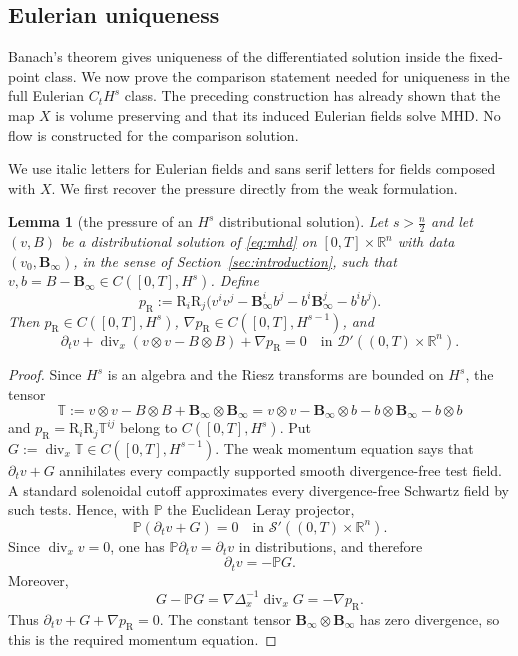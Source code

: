 \documentclass[11pt,reqno]{amsart}
\theoremstyle{plain}
\newtheorem{lemma}[theorem]{Lemma}
\theoremstyle{definition}
\theoremstyle{remark}
\numberwithin{equation}{section}
\DeclareMathOperator{\Div}{div}
\newcommand{\Binf}{\mathbf B_\infty}
\newcommand{\Real}{\mathbb R}
\newcommand{\Rn}{\Real^n}
\newcommand{\Riesz}{\mathrm R}
\begin{document}
\subsection{Eulerian uniqueness}
\label{ssec:unconditional-uniqueness}

Banach's theorem gives uniqueness of the differentiated solution inside the
fixed-point class. We now prove the comparison statement needed for uniqueness
in the full Eulerian $C_tH^s$ class. The preceding construction has already
shown that the map $X$ is volume preserving and that its induced Eulerian
fields solve MHD. No flow is constructed for the comparison solution.

We use italic letters for Eulerian fields and sans serif letters for fields
composed with $X$. We first recover the pressure directly from the weak
formulation.

\begin{lemma}[the pressure of an $H^s$ distributional solution]
\label{lem:pressure-recovery}
Let $s>\frac n2$ and let $(v,B)$ be a distributional solution of
\eqref{eq:mhd} on $[0,T]\times\Rn$ with data $(v_0,\Binf)$, in the sense of
Section~\ref{sec:introduction}, such that
$v,b=B-\Binf\in C([0,T],H^s)$. Define
\[
 p_{\mathrm R}:=\Riesz_i\Riesz_j
 \big(v^iv^j-\Binf^ib^j-b^i\Binf^j-b^ib^j\big).
\]
Then $p_{\mathrm R}\in C([0,T],H^s)$,
$\nabla p_{\mathrm R}\in C([0,T],H^{s-1})$, and
\[
 \partial_tv+\Div_x(v\otimes v-B\otimes B)+\nabla p_{\mathrm R}=0
 \quad\text{in }\mathcal D'((0,T)\times\Rn).
\]
\end{lemma}

\begin{proof}
Since $H^s$ is an algebra and the Riesz transforms are bounded on $H^s$, the
tensor
\[
 \mathbb T:=v\otimes v-B\otimes B+\Binf\otimes\Binf
 =v\otimes v-\Binf\otimes b-b\otimes\Binf-b\otimes b
\]
and $p_{\mathrm R}=\Riesz_i\Riesz_j\mathbb T^{ij}$ belong to
$C([0,T],H^s)$. Put $G:=\Div_x\mathbb T\in C([0,T],H^{s-1})$. The weak
momentum equation says that $\partial_tv+G$ annihilates every compactly
supported smooth divergence-free test field. A standard solenoidal cutoff
approximates every divergence-free Schwartz field by such tests. Hence, with
$\mathbb P$ the Euclidean Leray projector,
\[
 \mathbb P(\partial_tv+G)=0
 \quad\text{in }\mathcal S'((0,T)\times\Rn).
\]
Since $\Div_xv=0$, one has $\mathbb P\partial_tv=\partial_tv$ in
distributions, and therefore
\[
 \partial_tv=-\mathbb P G.
\]
Moreover,
\[
 G-\mathbb PG=\nabla\Delta_x^{-1}\Div_xG=-\nabla p_{\mathrm R}.
\]
Thus $\partial_tv+G+\nabla p_{\mathrm R}=0$. The constant tensor
$\Binf\otimes\Binf$ has zero divergence, so this is the required momentum
equation.
\end{proof}
\end{document}
